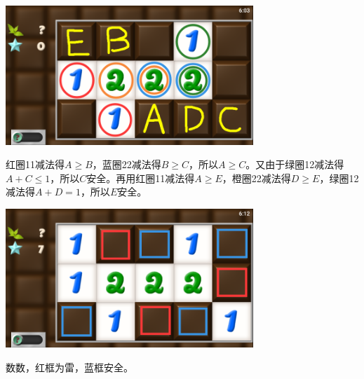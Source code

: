 \subsection{} %
\begin{center}
    \includegraphics[width=0.7\textwidth]{puzzle/67-1.png}
\end{center}
红圈11减法得$A\ge B$，蓝圈22减法得$B\ge C$，所以$A\ge C$。又由于绿圈12减法得$A+C\le 1$，所以$C$安全。再用红圈11减法得$A\ge E$，橙圈22减法得$D\ge E$，绿圈12减法得$A+D=1$，所以$E$安全。
\begin{center}
    \includegraphics[width=0.7\textwidth]{puzzle/67-2.png}
\end{center}
数数，红框为雷，蓝框安全。

